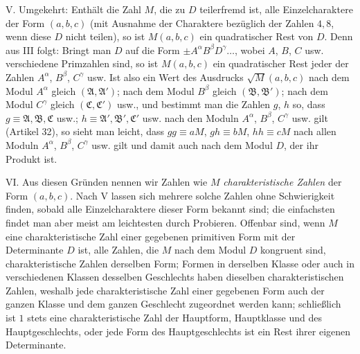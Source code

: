 V. Umgekehrt: Enthält die Zahl $M$, die zu $D$ teilerfremd ist, alle Einzelcharaktere der Form $(a,b,c)$ (mit Ausnahme der Charaktere bezüglich der Zahlen $4,8$, wenn diese $D$ nicht teilen), so ist $M(a,b,c)$ ein quadratischer Rest von $D$. Denn aus III folgt: Bringt man $D$ auf die Form $\pm A^\alpha B^\beta D^\gamma\ldots$, wobei $A$, $B$, $C$ usw. verschiedene Primzahlen sind, so ist $M(a,b,c)$ ein quadratischer Rest jeder der Zahlen $A^\alpha$, $B^\beta$, $C^\gamma$ usw. Ist also ein Wert des Ausdrucks $\surd M(a,b,c)$ nach dem Modul $A^\alpha$ gleich $(\mathfrak{A},\mathfrak{A}')$; nach dem Modul $B^\beta$ gleich $(\mathfrak{B},\mathfrak{B}')$; nach dem Modul $C^\gamma$ gleich $(\mathfrak{C},\mathfrak{C}')$ usw., und bestimmt man die Zahlen $g$, $h$ so, dass $g\equiv\mathfrak{A},\mathfrak{B},\mathfrak{C}$ usw.; $h\equiv\mathfrak{A}',\mathfrak{B}',\mathfrak{C}'$ usw. nach den Moduln $A^\alpha$, $B^\beta$, $C^\gamma$ usw. gilt (Artikel 32), so sieht man leicht, dass $gg\equiv aM$, $gh\equiv bM$, $hh\equiv cM$ nach allen Moduln $A^\alpha$, $B^\beta$, $C^\gamma$ usw. gilt und damit auch nach dem Modul $D$, der ihr Produkt ist.

VI. Aus diesen Gründen nennen wir Zahlen wie $M$ \textit{charakteristische Zahlen} der Form $(a,b,c)$. Nach V lassen sich mehrere solche Zahlen ohne Schwierigkeit finden, sobald alle Einzelcharaktere dieser Form bekannt sind; die einfachsten findet man aber meist am leichtesten durch Probieren. Offenbar sind, wenn $M$ eine charakteristische Zahl einer gegebenen primitiven Form mit der Determinante $D$ ist, alle Zahlen, die $M$ nach dem Modul $D$ kongruent sind, charakteristische Zahlen derselben Form; Formen in derselben Klasse oder auch in verschiedenen Klassen desselben Geschlechts haben dieselben charakteristischen Zahlen, weshalb jede charakteristische
Zahl einer gegebenen Form auch der ganzen Klasse und dem ganzen Geschlecht zugeordnet werden kann; schließlich ist $1$ stets eine charakteristische Zahl der Hauptform, Hauptklasse und des Hauptgeschlechts, oder jede Form des Hauptgeschlechts ist ein Rest ihrer eigenen Determinante.

